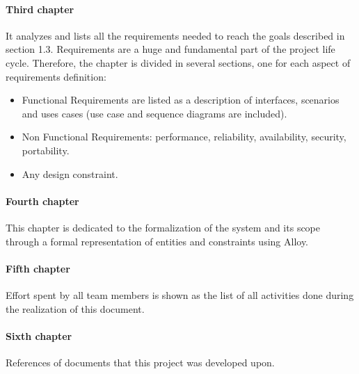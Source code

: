 \documentclass[../rasd.tex]{subfiles}
\begin{document}
		\paragraph{Third chapter}
		It analyzes and lists all the requirements needed to reach the goals described in section 1.3. Requirements are a huge and fundamental part of the project life cycle. Therefore, the chapter is divided in several sections, one for each aspect of requirements definition:
		\begin{itemize}
			\item Functional Requirements are listed as a description of interfaces, scenarios and uses cases (use case and sequence diagrams are included).
			\item Non Functional Requirements: performance, reliability, availability, security, portability.
			\item Any design constraint.
		\end{itemize}
		\paragraph{Fourth chapter}
		This chapter is dedicated to the formalization of the system and its scope through a formal representation of entities and constraints using Alloy.
		\paragraph{Fifth chapter}
		Effort spent by all team members is shown as the list of all activities done during the realization of this document.
		\paragraph{Sixth chapter}
		References of documents that this project was developed upon.
		
\end{document}
